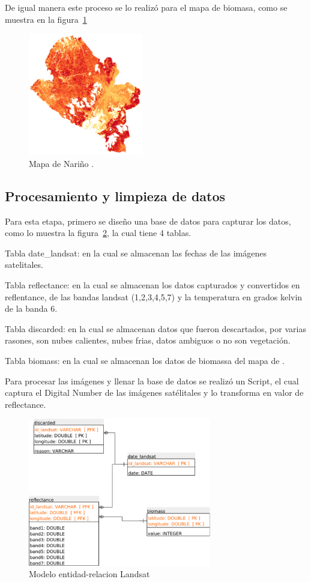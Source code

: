 De igual manera este proceso se lo realizó para el mapa de biomasa, como se muestra en la figura~\ref{fig:mapaNarino}


\begin{figure}
  \centering
  \includegraphics[width = 5cm]{mapaNarino.png}
  \caption{Mapa de Nariño .}
  \label{fig:mapaNarino}
\end{figure}

\subsection{Procesamiento y limpieza de datos}

Para esta etapa, primero se diseño una base de datos para capturar los datos,
como lo muestra la figura~\ref{fig:landsatET}, la cual tiene 4 tablas. 

Tabla date\_landsat: en la cual se almacenan las fechas de las imágenes satelitales.

Tabla reflectance: en la cual se almacenan los datos capturados y convertidos en reflentance,
de las bandas landsat (1,2,3,4,5,7) y la temperatura en grados kelvin de la banda 6.

Tabla discarded: en la cual se almacenan datos que fueron descartados, por varias rasones,
son nubes calientes, nubes frias, datos ambiguos o no son vegetación.

Tabla biomass: en la cual se almacenan los datos de biomassa del mapa de \cite{baccini2012estimated}.

Para procesar las imágenes y llenar la base de datos se realizó un Script, el cual captura el Digital Number
de las imágenes satélitales y lo transforma en valor de reflectance.

\begin{figure}
  \centering
  \includegraphics[width = 8cm]{landsatET.pdf}
  \caption{Modelo entidad-relacion Landsat}
  \label{fig:landsatET}
\end{figure}



